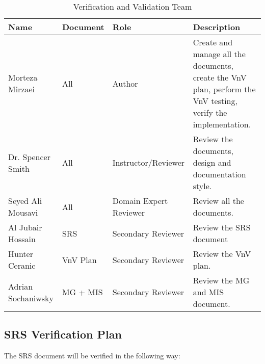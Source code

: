 \documentclass[12pt, titlepage]{article}
\begin{document}
\begin{table}[h!]
  \caption{Verification and Validation Team} \label{team}
  \vspace*{3mm}
  \begin{tabular}{|p{}|p{}|p{}|p{}|}
  \hline
  \textbf{Name} & \textbf{Document} & \textbf{Role} & \textbf{Description} \\
  \hline
  Morteza Mirzaei & All & Author & Create and manage all the documents, create the VnV plan, perform the VnV testing, verify the implementation. \\  
  \hline
  Dr. Spencer Smith & All & Instructor/Reviewer & Review the documents, design and documentation style. \\ 
  \hline
  Seyed Ali Mousavi & All & Domain Expert Reviewer & Review all the documents. \\  
  \hline
  Al Jubair Hossain & SRS & Secondary Reviewer & Review the SRS document \\
  \hline
  Hunter Ceranic & VnV Plan & Secondary Reviewer & Review the VnV plan. \\ 
  \hline 
  Adrian Sochaniwsky & MG + MIS & Secondary Reviewer & Review the MG and MIS document. \\
  \hline 
  \end{tabular}
\end{table}


\subsection{SRS Verification Plan}

The SRS document will be verified in the following way:
\end{document}
